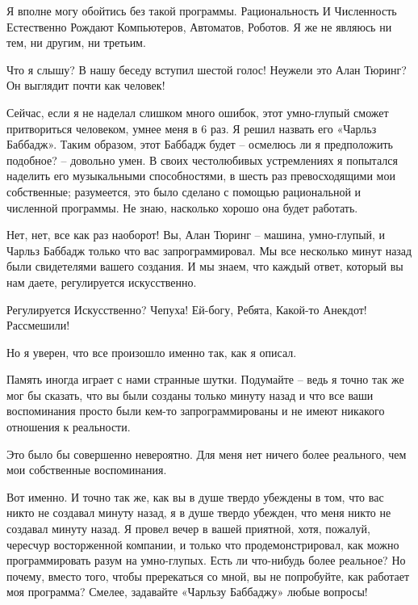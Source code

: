 \documentclass[../main.tex]{subfiles}
\begin{document}
\begin{dialogue}
 Я вполне могу обойтись без такой программы. Рациональность И Численность Естественно Рождают Компьютеров, Автоматов, Роботов. Я же не являюсь ни тем, ни другим, ни третьим.

 Что я слышу? В нашу беседу вступил шестой голос! Неужели это Алан Тюринг? Он выглядит почти как человек!


 Сейчас, если я не наделал слишком много ошибок, этот умно-глупый сможет притвориться человеком, умнее меня в 6 раз. Я решил назвать его «Чарльз Баббадж». Таким образом, этот Баббадж будет \--- осмелюсь ли я предположить подобное? \--- довольно умен. В своих честолюбивых устремлениях я попытался наделить его музыкальными способностями, в шесть раз превосходящими мои собственные; разумеется, это было сделано с помощью рациональной и численной программы. Не знаю, насколько хорошо она будет работать.

 Нет, нет, все как раз наоборот! Вы, Алан Тюринг \--- машина, умно-глупый, и Чарльз Баббадж только что вас запрограммировал. Мы все несколько минут назад были свидетелями вашего создания. И мы знаем, что каждый ответ, который вы нам даете, регулируется искусственно.

 Регулируется Искусственно? Чепуха! Ей-богу, Ребята, Какой-то Анекдот! Рассмешили!

 Но я уверен, что все произошло именно так, как я описал.

 Память иногда играет с нами странные шутки. Подумайте \--- ведь я точно так же мог бы сказать, что вы были созданы только минуту назад и что все ваши воспоминания просто были кем-то запрограммированы и не имеют никакого отношения к реальности.

 Это было бы совершенно невероятно. Для меня нет ничего более реального, чем мои собственные воспоминания.

 Вот именно. И точно так же, как вы в душе твердо убеждены в том, что вас никто не создавал минуту назад, я в душе твердо убежден, что меня никто не создавал минуту назад. Я провел вечер в вашей приятной, хотя, пожалуй, чересчур восторженной компании, и только что продемонстрировал, как можно программировать разум на умно-глупых. Есть ли что-нибудь более реальное? Но почему, вместо того, чтобы пререкаться со мной, вы не попробуйте, как работает моя программа? Смелее, задавайте «Чарльзу Баббаджу» любые вопросы!


\end{dialogue}
\end{document}
